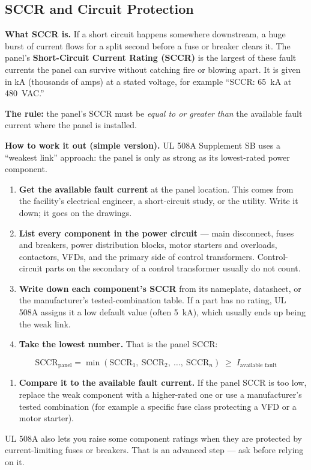 \subsection{SCCR and Circuit Protection}\label{sec:sccr}
\textbf{What SCCR is.} If a short circuit happens somewhere downstream, a huge burst of current flows for a split second before a fuse or breaker clears it. The panel's \textbf{Short-Circuit Current Rating (SCCR)} is the largest of these fault currents the panel can survive without catching fire or blowing apart. It is given in kA (thousands of amps) at a stated voltage, for example ``SCCR: 65~kA at 480~VAC.''

\textbf{The rule:} the panel's SCCR must be \emph{equal to or greater than} the available fault current where the panel is installed.

\textbf{How to work it out (simple version).} UL 508A Supplement SB uses a ``weakest link'' approach: the panel is only as strong as its lowest-rated power component.
\begin{enumerate}[itemsep=2pt]
  \item \textbf{Get the available fault current} at the panel location. This comes from the facility's electrical engineer, a short-circuit study, or the utility. Write it down; it goes on the drawings.
  \item \textbf{List every component in the power circuit} --- main disconnect, fuses and breakers, power distribution blocks, motor starters and overloads, contactors, VFDs, and the primary side of control transformers. Control-circuit parts on the secondary of a control transformer usually do not count.
  \item \textbf{Write down each component's SCCR} from its nameplate, datasheet, or the manufacturer's tested-combination table. If a part has no rating, UL 508A assigns it a low default value (often 5~kA), which usually ends up being the weak link.
  \item \textbf{Take the lowest number.} That is the panel SCCR:
\end{enumerate}
\[
  \text{SCCR}_{\text{panel}} = \min\left(\text{SCCR}_{1},\ \text{SCCR}_{2},\ \dots,\ \text{SCCR}_{n}\right) \;\geq\; I_{\text{available fault}}
\]
\begin{enumerate}[resume,itemsep=2pt]
  \item \textbf{Compare it to the available fault current.} If the panel SCCR is too low, replace the weak component with a higher-rated one or use a manufacturer's tested combination (for example a specific fuse class protecting a VFD or a motor starter).
\end{enumerate}
UL 508A also lets you raise some component ratings when they are protected by current-limiting fuses or breakers. That is an advanced step --- ask before relying on it.

